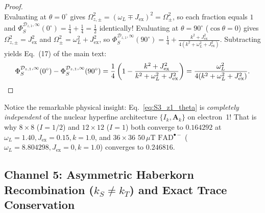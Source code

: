 \documentclass[onecolumn,10pt,notitlepage,amsmath,amssymb,floatfix]{revtex4-2}
\theoremstyle{plain}
\theoremstyle{definition}
\begin{document}
\begin{proof}
\begin{equation}
\end{equation}
Evaluating at $\theta = 0^\circ$ gives $\Omega_{z,\pm}^2 = (\omega_L \mp J_{\mathrm{ex}})^2 = \Omega_\pm^2$, so each fraction equals $1$ and $\Phi_S^{\mathcal{D}_{z,1},\infty}(0^\circ) = \frac{1}{4} + \frac{1}{4} = \frac{1}{2}$ identically! Evaluating at $\theta = 90^\circ$ ($\cos\theta = 0$) gives $\Omega_{z,\pm}^2 = J_{\mathrm{ex}}^2$ and $\Omega_\pm^2 = \omega_L^2 + J_{\mathrm{ex}}^2$, so $\Phi_S^{\mathcal{D}_{z,1},\infty}(90^\circ) = \frac{1}{4} + \frac{k^2 + J_{\mathrm{ex}}^2}{4(k^2+\omega_L^2+J_{\mathrm{ex}}^2)}$. Subtracting yields Eq.~(17) of the main text:
\[
\Phi_S^{\mathcal{D}_{z,1},\infty}(0^\circ) - \Phi_S^{\mathcal{D}_{z,1},\infty}(90^\circ)
= \frac{1}{4}\left(1 - \frac{k^2 + J_{\mathrm{ex}}^2}{k^2 + \omega_L^2 + J_{\mathrm{ex}}^2}\right)
= \frac{\omega_L^2}{4(k^2 + \omega_L^2 + J_{\mathrm{ex}}^2)}. \qedhere
\]
\end{proof}
Notice the remarkable physical insight: Eq.~\eqref{eq:S3_z1_theta} is \emph{completely independent} of the nuclear hyperfine architecture $\{I_k, \mathbf{A}_k\}$ on electron~1! That is why $8\times 8$ ($I=1/2$) and $12\times 12$ ($I=1$) both converge to $0.164292$ at $\omega_L = 1.40, J_{\mathrm{ex}} = 0.15, k = 1.0$, and $36\times 36$ $50\,\mu\text{T}$ $\mathrm{FAD}^{\bullet-}$ ($\omega_L = 8.804298, J_{\mathrm{ex}} = 0, k = 1.0$) converges to $0.246816$.

\subsection{Channel 5: Asymmetric Haberkorn Recombination (\texorpdfstring{$k_S \neq k_T$}{k\_S != k\_T}) and Exact Trace Conservation}
\end{document}

